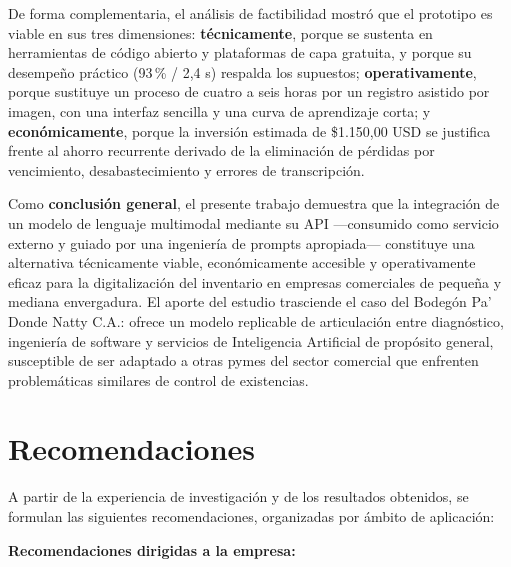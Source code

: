 \documentclass[12pt, letterpaper]{report}
\begin{document}
De forma complementaria, el análisis de factibilidad mostró que el
prototipo es viable en sus tres dimensiones: \textbf{técnicamente},
porque se sustenta en herramientas de código abierto y plataformas de
capa gratuita, y porque su desempeño práctico (93\,\% / 2,4 s)
respalda los supuestos; \textbf{operativamente}, porque sustituye un
proceso de cuatro a seis horas por un registro asistido por imagen,
con una interfaz sencilla y una curva de aprendizaje corta; y
\textbf{económicamente}, porque la inversión estimada de \$1.150,00
USD se justifica frente al ahorro recurrente derivado de la
eliminación de pérdidas por vencimiento, desabastecimiento y errores
de transcripción.

Como \textbf{conclusión general}, el presente trabajo demuestra que la
integración de un modelo de lenguaje multimodal mediante su API
---consumido como servicio externo y guiado por una ingeniería de
prompts apropiada--- constituye una alternativa técnicamente viable,
económicamente accesible y operativamente eficaz para la
digitalización del inventario en empresas comerciales de pequeña y
mediana envergadura. El aporte del estudio trasciende el caso del
Bodegón Pa' Donde Natty C.A.: ofrece un modelo replicable de
articulación entre diagnóstico, ingeniería de software y servicios de
Inteligencia Artificial de propósito general, susceptible de ser
adaptado a otras pymes del sector comercial que enfrenten
problemáticas similares de control de existencias.

\section{Recomendaciones}

A partir de la experiencia de investigación y de los resultados
obtenidos, se formulan las siguientes recomendaciones, organizadas por
ámbito de aplicación:

\textbf{Recomendaciones dirigidas a la empresa:}
\end{document}
